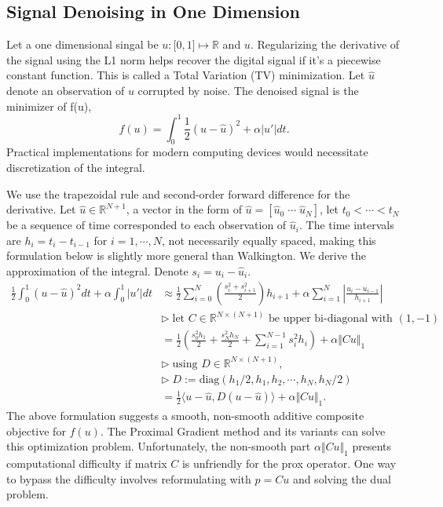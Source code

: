 \documentclass[]{article}
\theoremstyle{definition}
\numberwithin{equation}{subsection}
\begin{document}
    \subsection{Signal Denoising in One Dimension}
        Let a one dimensional singal be $u: \mathbb [0, 1]\mapsto \mathbb R$ and $u$. 
        Regularizing the derivative of the signal using the L1 norm helps recover the digital signal if it's a piecewise constant function. 
        This is called a Total Variation (TV) minimization. 
        Let $\hat u$ denote an observation of $u$ corrupted by noise. 
        The denoised signal is the minimizer of f(u),
        \[
            f(u) = \int_0^1 \frac{1}{2} 
            (u - \hat u)^2 + \alpha |u'|dt. 
        \]
        Practical implementations for modern computing devices would necessitate discretization of the integral. 
        \par
        We use the trapezoidal rule and second-order forward difference for the derivative. 
        Let $\hat u \in \mathbb R^{N+1}$, a vector in the form of $\hat u = [\hat u_0\; \cdots \; \hat u_{N}]$, let $t_0<  \cdots <t_N$ be a sequence of time corresponded to each observation of $\hat u_i$. 
        The time intervals are $h_i = t_{i} - t_{i-1}$ for $i=1, \cdots, N$, not necessarily equally spaced, making this formulation below is slightly more general than Walkington\cite{noel_nesterovs_nodate}. 
        We derive the approximation of the integral. Denote $s_i = u_i - \hat u_i$. 
        \begin{align*}
            \frac{1}{2}\int_{0}^{1} (u - \hat u)^2 dt + 
            \alpha \int_0^1 |u'| dt
            &\approx
            \frac{1}{2}
            \sum_{i = 0}^{N}
            \left(
                \frac{s_i^2 + s_{i + 1}^2}{2}
            \right)h_{i + 1}
            + 
            \alpha
            \sum_{i = 1}^{N}
            \left|
                \frac{u_{i} - u_{i - 1}}{h_{i + 1}}
            \right|
            \\
            & \triangleright\; \text{let } 
            C\in \mathbb R^{N\times (N + 1)} \text{ be upper bi-diagonal with }(1, -1)
            \\
            &= \frac{1}{2}\left(
                \frac{s_0^2h_1}{2} + \frac{s_N^2h_N}{2}
                + 
                \sum_{i = 1}^{N - 1}s_i^2 h_i
            \right) + \alpha\Vert Cu\Vert_1
            \\
            & 
            \triangleright \; \text{using } D\in \mathbb R^{N \times (N + 1)},
            \\
            & \triangleright\; D := \text{diag}(h_1/2, h_1, h_2, \cdots, h_N, h_N/2)
            \\
            &= 
            \frac{1}{2}\langle u - \hat u, D(u - \hat u)\rangle + \alpha \Vert Cu\Vert_1. 
        \end{align*}
    The above formulation suggests a smooth, non-smooth additive composite objective for $f(u)$. 
    The Proximal Gradient method and its variants can solve this optimization problem. 
    Unfortunately, the non-smooth part $\alpha\Vert Cu\Vert_1$ presents computational difficulty if matrix $C$ is unfriendly for the prox operator. 
    One way to bypass the difficulty involves reformulating with $p = Cu$ and solving the dual problem. 
\end{document}
